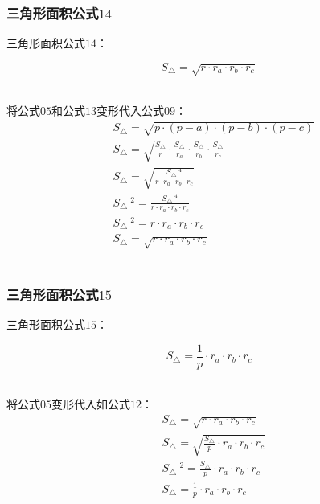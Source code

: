 \documentclass[UTF8]{ctexart}
\begin{document}
\newpage

\subsubsection{三角形面积公式$14$}
    三角形面积公式$14$：
    \begin{large}
        \begin{equation*}
            S_{\triangle}=\sqrt{r\cdot r_a\cdot r_b\cdot r_c}
        \end{equation*}
    \end{large}\\
    将公式$05$和公式$13$变形代入公式$09$：
    \setcounter{equation}{0}
    \begin{align}
        &S_{\triangle}=\sqrt{p\cdot(p-a)\cdot(p-b)\cdot(p-c)}\\[3mm]
        &S_{\triangle}=\sqrt{\frac{S_{\triangle}}{r}\cdot\frac{S_{\triangle}}{r_a}\cdot\frac{S_{\triangle}}{r_b}\cdot\frac{S_{\triangle}}{r_c}}\\[3mm]
        &S_{\triangle}=\sqrt{\frac{S_{\triangle}~^4}{r\cdot r_a\cdot r_b\cdot r_c}}\\[3mm]
        &S_{\triangle}~^2=\frac{S_{\triangle}~^4}{r\cdot r_a\cdot r_b\cdot r_c}\\[3mm]
        &S_{\triangle}~^2=r\cdot r_a\cdot r_b\cdot r_c\\[3mm]
        &S_{\triangle}=\sqrt{r\cdot r_a\cdot r_b\cdot r_c}
    \end{align}\\

\subsubsection{三角形面积公式$15$}
    三角形面积公式$15$：
    \begin{large}
        \begin{equation*}
            S_{\triangle}=\frac{1}{p}\cdot r_a\cdot r_b\cdot r_c
        \end{equation*}
    \end{large}\\
    将公式$05$变形代入如公式$12$：
    \setcounter{equation}{0}
    \begin{align}
        &S_{\triangle}=\sqrt{r\cdot r_a\cdot r_b\cdot r_c}\\[3mm]
        &S_{\triangle}=\sqrt{\frac{S_{\triangle}}{p}\cdot r_a\cdot r_b\cdot r_c}\\[3mm]
        &S_{\triangle}~^2=\frac{S_{\triangle}}{p}\cdot r_a\cdot r_b\cdot r_c\\[3mm]
        &S_{\triangle}=\frac{1}{p}\cdot r_a\cdot r_b\cdot r_c
    \end{align}
\end{document}
